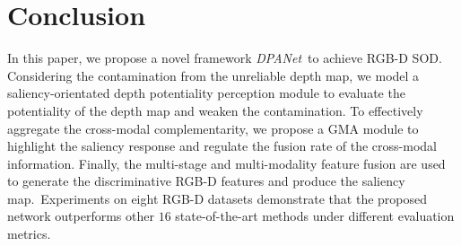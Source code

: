 \documentclass[journal]{IEEEtran}
\def\OURNET{\textit{DPANet}}
\begin{document}
\section{Conclusion}
In this paper, we propose a novel framework \OURNET\ to achieve RGB-D SOD. Considering the contamination from the unreliable depth map, we model a saliency-orientated depth potentiality perception module to evaluate the potentiality of the depth map and weaken the contamination. To effectively aggregate the cross-modal complementarity, we propose a GMA module to highlight the saliency response and regulate the fusion rate of the cross-modal information. Finally, the multi-stage and multi-modality feature fusion are used to generate the discriminative RGB-D features and produce the saliency map.\ Experiments on eight RGB-D datasets demonstrate that the proposed network outperforms other $16$ state-of-the-art methods under different evaluation metrics.


\par
\ifCLASSOPTIONcaptionsoff
  \newpage
\fi
{


}
\end{document}
